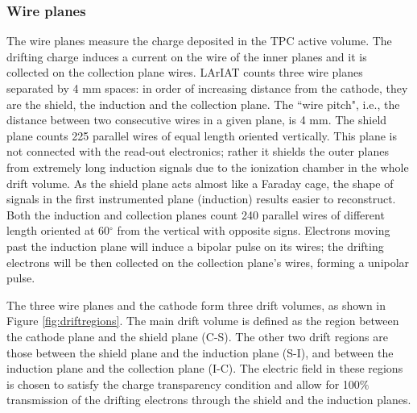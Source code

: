 \subsubsection{Wire planes}
The wire planes measure the charge deposited in the TPC active volume. The drifting charge induces a current on the wire of the inner planes and it is collected on the collection plane wires.
LArIAT counts three wire planes separated by 4 mm spaces: in order of increasing distance from the cathode, they are the shield, the induction and the collection plane. The ``wire pitch", i.e., the distance between two consecutive wires in a given plane, is 4 mm.  The shield plane counts 225 parallel wires of equal length oriented vertically. This plane is not connected with the read-out electronics; rather it shields the outer planes from extremely long induction signals due to the ionization chamber in the whole drift volume. As the shield plane acts almost like a Faraday cage, the shape of signals in the first instrumented plane (induction)  results easier to reconstruct.  Both the induction and collection planes count 240 parallel wires of different length oriented at 60$^\circ$ from the vertical with opposite signs.
Electrons moving past the induction plane will induce a bipolar pulse on its wires; the drifting electrons will be then collected on the collection plane's wires, forming a unipolar pulse. 

The three wire planes and the cathode form three drift volumes, as shown in Figure \ref{fig:driftregions}. 
The main drift volume is defined as the region between the cathode plane and the shield plane (C-S). The other two drift regions are those between the shield plane and the induction plane (S-I), and between the induction plane and the collection plane (I-C). The electric field in these regions is chosen to satisfy the charge transparency condition and allow for 100$\%$ transmission of the drifting electrons through the shield and the induction planes. 

